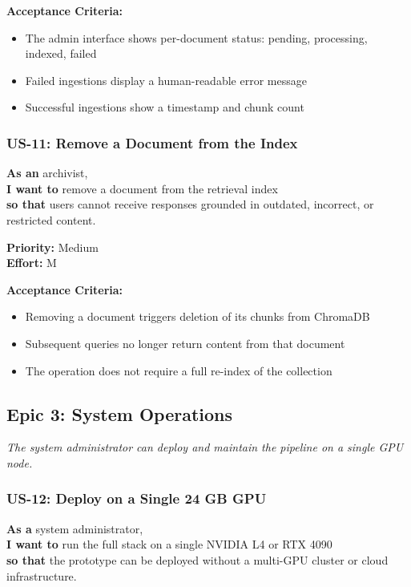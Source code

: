 \documentclass[
  11pt,
]{article}
\providecommand{\tightlist}{%
  \setlength{\itemsep}{0pt}\setlength{\parskip}{0pt}}
\begin{document}
\textbf{Acceptance Criteria:}

\begin{itemize}
\tightlist
\item
  The admin interface shows per-document status: pending, processing,
  indexed, failed
\item
  Failed ingestions display a human-readable error message
\item
  Successful ingestions show a timestamp and chunk count
\end{itemize}

\subsubsection{US-11: Remove a Document from the
Index}\label{us-11-remove-a-document-from-the-index}

\textbf{As an} archivist,\\
\textbf{I want to} remove a document from the retrieval index\\
\textbf{so that} users cannot receive responses grounded in outdated,
incorrect, or restricted content.

\textbf{Priority:} Medium\\
\textbf{Effort:} M

\textbf{Acceptance Criteria:}

\begin{itemize}
\tightlist
\item
  Removing a document triggers deletion of its chunks from ChromaDB
\item
  Subsequent queries no longer return content from that document
\item
  The operation does not require a full re-index of the collection
\end{itemize}

\subsection{Epic 3: System Operations}\label{epic-3-system-operations}

\emph{The system administrator can deploy and maintain the pipeline on a
single GPU node.}

\subsubsection{US-12: Deploy on a Single 24 GB
GPU}\label{us-12-deploy-on-a-single-24-gb-gpu}

\textbf{As a} system administrator,\\
\textbf{I want to} run the full stack on a single NVIDIA L4 or RTX
4090\\
\textbf{so that} the prototype can be deployed without a multi-GPU
cluster or cloud infrastructure.
\end{document}
